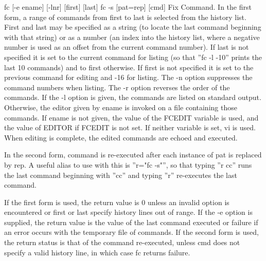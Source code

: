 {fc [-e ename] [-lnr] [first] [last]
fc -s [pat=rep] [cmd]
Fix Command. In the first form, a range of commands from first to last is selected from the history list. First and last may be specified as a string (to locate the last command beginning with that string) or as a number (an index into the history list, where a negative number is used as an offset from the current command number). If last is not specified it is set to the current command for listing (so that ''fc -l -10'' prints the last 10 commands) and to first otherwise. If first is not specified it is set to the previous command for editing and -16 for listing.
The -n option suppresses the command numbers when listing. The -r option reverses the order of the commands. If the -l option is given, the commands are listed on standard output. Otherwise, the editor given by ename is invoked on a file containing those commands. If ename is not given, the value of the FCEDIT variable is used, and the value of EDITOR if FCEDIT is not set. If neither variable is set, vi is used. When editing is complete, the edited commands are echoed and executed.

In the second form, command is re-executed after each instance of pat is replaced by rep. A useful alias to use with this is ''r="fc -s"'', so that typing ''r cc'' runs the last command beginning with ''cc'' and typing ''r'' re-executes the last command.

If the first form is used, the return value is 0 unless an invalid option is encountered or first or last specify history lines out of range. If the -e option is supplied, the return value is the value of the last command executed or failure if an error occurs with the temporary file of commands. If the second form is used, the return status is that of the command re-executed, unless cmd does not specify a valid history line, in which case fc returns failure.

}
